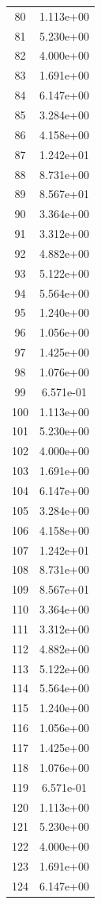 \documentclass[12pt]{article}
\begin{document}
\begin{longtable}{@{}cc@{}}
80 & 1.113e+00 \\
81 & 5.230e+00 \\
82 & 4.000e+00 \\
83 & 1.691e+00 \\
84 & 6.147e+00 \\
85 & 3.284e+00 \\
86 & 4.158e+00 \\
87 & 1.242e+01 \\
88 & 8.731e+00 \\
89 & 8.567e+01 \\
90 & 3.364e+00 \\
91 & 3.312e+00 \\
92 & 4.882e+00 \\
93 & 5.122e+00 \\
94 & 5.564e+00 \\
95 & 1.240e+00 \\
96 & 1.056e+00 \\
97 & 1.425e+00 \\
98 & 1.076e+00 \\
99 & 6.571e-01 \\
100 & 1.113e+00 \\
101 & 5.230e+00 \\
102 & 4.000e+00 \\
103 & 1.691e+00 \\
104 & 6.147e+00 \\
105 & 3.284e+00 \\
106 & 4.158e+00 \\
107 & 1.242e+01 \\
108 & 8.731e+00 \\
109 & 8.567e+01 \\
110 & 3.364e+00 \\
111 & 3.312e+00 \\
112 & 4.882e+00 \\
113 & 5.122e+00 \\
114 & 5.564e+00 \\
115 & 1.240e+00 \\
116 & 1.056e+00 \\
117 & 1.425e+00 \\
118 & 1.076e+00 \\
119 & 6.571e-01 \\
120 & 1.113e+00 \\
121 & 5.230e+00 \\
122 & 4.000e+00 \\
123 & 1.691e+00 \\
124 & 6.147e+00 \\

\end{longtable}
\end{document}
